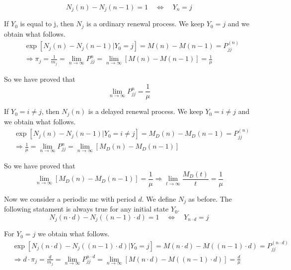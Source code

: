 	\begin{equation}
		N_j(n)-N_j(n-1)=1 \quad \Leftrightarrow \quad Y_n=j
	\end{equation}

	If $Y_0$ is equal to j, then $N_j$ is a ordinary renewal process. We keep $Y_0=j$ and we obtain what follows.
	\begin{align*}
		& \exp[N_j(n)-N_j(n-1)|Y_0=j]=M(n)-M(n-1)=P_{jj}^{(n)}
		\\ & \Rightarrow \pi_j=\frac{1}{m_j}=\lim_{n \to \infty} P_{jj}^{n} = \lim_{n \to \infty} [M(n)-M(n-1)]=\frac{1}{\mu}
	\end{align*}

	So we have proved that
	\begin{equation}
		\lim_{n \to \infty} P_{jj}^{n}=\frac{1}{\mu}
	\end{equation}

	If $Y_0=i \neq j$, then $N_j(n)$ is a delayed renewal process. We keep $Y_0=i \neq j$ and we obtain what follows.
	\begin{align*}
		& \exp[N_j(n)-N_j(n-1)|Y_0=i \neq j]=M_D(n)-M_D(n-1)=P_{jj}^{(n)}
		\\ & \Rightarrow \frac{1}{\mu}=\lim_{n \to \infty} P_{jj}^{n} = \lim_{n \to \infty} [M_D(n)-M_D(n-1)]
	\end{align*}

	So we have proved that
	\begin{equation}
		\lim_{n \to \infty} [M_D(n)-M_D(n-1)]=\frac{1}{\mu} \Rightarrow \lim_{t \to \infty }\frac{M_D(t)}{t}=\frac{1}{\mu}
	\end{equation}

	Now we consider a periodic \gls{mc} with period $d$. We define $N_j$ as before. The following statament is always true for any initial state $Y_0$.
	\begin{equation}
		N_j(n \cdot d)-N_j((n-1)\cdot d)=1 \quad \Leftrightarrow \quad Y_{n \cdot d}=j
	\end{equation}

	For $Y_0=j$ we obtain what follows.
	\begin{align*}
		& \exp[N_j(n \cdot d)-N_j((n-1)\cdot d)|Y_0=j]=M(n \cdot d)-M((n-1)\cdot d)=P_{jj}^{(n \cdot d)}
		\\ & \Rightarrow d \cdot \pi_j=\frac{d}{m_j}=\lim_{n \to \infty} P_{jj}^{n \cdot d} = \lim_{n \to \infty} [ M(n \cdot d)- M( (n-1) \cdot d)]=\frac{d}{\mu}
	\end{align*}

